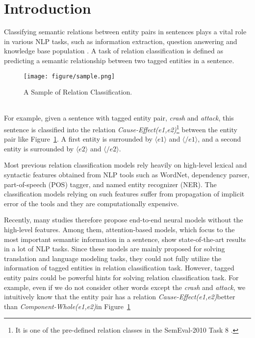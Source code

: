 \documentclass[twoside,leqno,twocolumn]{article}
\begin{document}
\section{Introduction}
Classifying semantic relations between entity pairs in sentences plays a vital role in various NLP tasks, such as information extraction, question answering and knowledge base population \cite{nguyen2015relation}. 
A task of relation classification is defined as predicting a semantic relationship between two tagged entities in a sentence.
\begin{figure}[!ht]
\texttt{[image: figure/sample.png]}
\caption{A Sample of Relation Classification.}
\label{fig:sample}
\end{figure}\\
For example, given a sentence with tagged entity pair, \textit{crash} and \textit{attack}, this sentence is classified into the relation \textit{Cause-Effect(e1,e2)}\footnote[1]{It is one of the pre-defined relation classes in the SemEval-2010 Task 8 \cite{hendrickx2009semeval}.} between the entity pair like Figure~\ref{fig:sample}.
A first entity is surrounded by $\langle e1\rangle$ and $\langle /e1\rangle$, and a second entity is surrounded by $\langle e2\rangle$ and $\langle /e2\rangle$.

Most previous relation classification models rely heavily on high-level lexical and syntactic features obtained from NLP tools such as WordNet, dependency parser, part-of-speech (POS) tagger, and named entity recognizer (NER).
The classification models relying on such features suffer from propagation of implicit error of the tools and they are computationally expensive.

Recently, many studies therefore propose end-to-end neural models without the high-level features.
Among them, attention-based models, which focus to the most important semantic information in a sentence, show state-of-the-art results in a lot of NLP tasks.
Since these models are mainly proposed for solving translation and language modeling tasks, they could not fully utilize the information of tagged entities in relation classification task.
However, tagged entity pairs could be powerful hints for solving relation classification task.
For example, even if we do not consider other words except the \textit{crash} and \textit{attack}, we intuitively know that the entity pair has a relation \textit{Cause-Effect(e1,e2)}\footnotemark[1] better than \textit{Component-Whole(e1,e2)}\footnotemark[1] in Figure~\ref{fig:sample}
\end{document}
